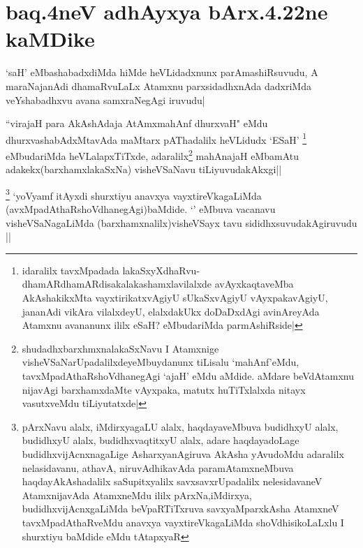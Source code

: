 \section*{baq.4neV adhAyxya bArx.4.22ne kaMDike}


\begin{artha}
`saH' eMbashabadxdiMda hiMde heVLidadxnunx parAmashiRsuvudu, A maraNajanAdi dhamaRvuLaLx Atamxnu parxsidadhxnAda dadxriMda veYshabadhxvu avana samxraNegAgi iruvudu|
\end{artha}


\begin{artha}
``virajaH para AkAshAdaja AtAmxmahAnf dhurxvaH" eMdu dhurxvashabAdxMtavAda maMtarx pAThadalilx heVLidudx `ESaH' \footnote{idaralilx tavxMpadada lakaSxyXdhaRvu-dhamARdhamARdisakalakashamxlavilalxde avAyxkaqtaveMba AkAshakikxMta vayxtirikatxvAgiyU sUkaSxvAgiyU vAyxpakavAgiyU, jananAdi vikAra vilalxdeyU, elalxdakUkx doDaDxdAgi avinAreyAda Atamxnu avananunx ililx eSaH? eMbudariMda parmAshiRside|} eMbudariMda heVLalapxTiTxde, adaralilx\footnote{shudadhxbarxhmxnalakaSxNavu I Atamxnige visheVSaNarUpadalilxdeyeMbuydanunx tiLisalu `mahAnf'eMdu, tavxMpadAthaRshoVdhanegAgi `ajaH' eMdu aMdide. aMdare beVdAtamxnu nijavAgi barxhamxdaMte vAyxpaka, matutx huTiTxlalxda nitayx vasutxveMdu tiLiyutatxde|} mahAnajaH eMbamAtu adakekx(barxhamxlakaSxNa) visheVSaNavu tiLiyuvudakAkxgi||
\end{artha}


\begin{artha}
\footnote{pArxNavu alalx, iMdirxyagaLU alalx, haqdayaveMbuva budidhxyU alalx, budidhxyU alalx, budidhxvaqtitxyU alalx, adare haqdayadoLage budidhxvijAcnxnagaLige AsharxyanAgiruva AkAsha yAvudoMdu adaralilx nelasidavanu, athavA, niruvAdhikavAda paramAtamxneMbuva haqdayAkAshadalilx saSupitxyalilx savxsavxrUpadalilx nelesidavaneV AtamxnijavAda AtamxneMdu ililx pArxNa,iMdirxya, budidhxvijAcnxgaLiMda beVpaRTiTxruva savxyaMparxkAsha AtamxneV tavxMpadAthaRveMdu anavxya vayxtireVkagaLiMda shoVdhisikoLaLxlu I shurxtiyu baMdide eMdu tAtapxyaR} `yoV\s yamf  itAyxdi shurxtiyu anavxya vayxtireVkagaLiMda (avxMpadAthaRshoVdhanegAgi)baMdide. `\stext' eMbuva vacanavu visheVSaNagaLiMda (barxhamxnalilx)visheVSayx tavu sididhxsuvudakAgiruvudu ||
\end{artha}

